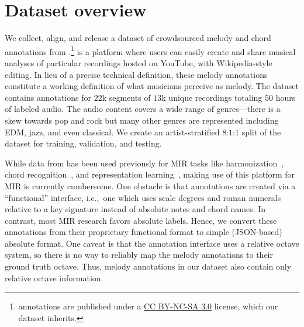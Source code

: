 \section{Dataset overview}
\label{sec:dataset}

We collect, align, and release a dataset of crowdsourced melody and chord annotations from \hooktheory{}.\footnote{\hooktheory{} annotations are published under a \href{https://creativecommons.org/licenses/by-nc-sa/3.0/}{CC BY-NC-SA 3.0} license, which our dataset inherits.}
\hooktheory{} is a platform where users can easily create and share musical analyses of particular recordings hosted on YouTube, with Wikipedia-style editing. 
In lieu of a precise technical definition, these melody annotations constitute a working definition of what musicians perceive as melody. 
The dataset contains annotations for $22$k segments of $13$k unique recordings totaling $50$ hours of labeled audio. 
The audio content covers a wide range of genres---there is a skew towards pop and rock but many other genres are represented including EDM, jazz, and even classical. 
We create an artist-stratified $8$:$1$:$1$ split of the dataset for training, validation, and testing.


While data from \hooktheory{} has been used previously for MIR tasks like 
harmonization~\cite{chen2021surprisenet,yeh2021automatic}, 
chord recognition~\cite{jiang2019mirex}, and 
representation learning~\cite{jiang2020transformer}, 
making use of this platform for MIR is currently cumbersome. 
One obstacle is that annotations are created via a ``functional'' interface, i.e.,~one which uses scale degrees and roman numerals relative to a key signature instead of absolute notes and chord names. 
In contrast, most MIR research favors absolute labels.
Hence, we convert these annotations from their proprietary functional format to simple (JSON-based) absolute format. 
One caveat is that the \hooktheory{} annotation interface uses a relative octave system, 
so there is no way to reliably map the melody annotations to their ground truth octave.
Thus, melody annotations in our dataset also contain only relative octave information.

